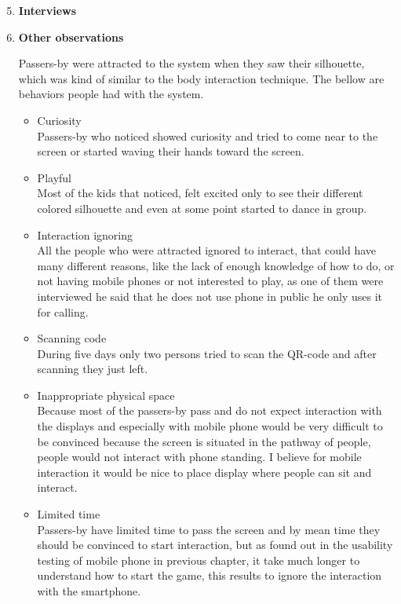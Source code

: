 \begin{enumerate}
\setcounter{enumi}{4}

\item \textbf{Interviews}



\newpage
\item \textbf{Other observations}

Passers-by were attracted to the system when they saw their silhouette, which was kind of similar to the body interaction technique. The bellow are behaviors people had with the system.

\begin{itemize}
\item Curiosity \\
Passers-by who noticed showed curiosity and tried to come near to the screen or started waving their hands toward the screen.
 

\item Playful   \\
Most of the kids that noticed, felt excited only to see their different colored silhouette and even at some point started to dance in group. 


\item Interaction ignoring \\
All the people who were attracted ignored to interact, that could have many different reasons, like the lack of enough knowledge of how to do, or not having mobile phones or not interested to play, as one of them were interviewed he said that he does not use phone in public he only uses it for calling. 

\item Scanning code \\ 
During five days only two persons tried to scan the QR-code and after scanning they just left.


\iffalse
\item Inappropriate physical space \\
Because most of the passers-by pass and do not expect interaction with the displays and especially with mobile phone would be very difficult to be convinced because the screen is situated in the pathway of people, people would not interact with phone standing. I believe for mobile interaction it would be nice to place display where people can sit and interact.

\item Limited time \\
Passers-by have limited time to pass the screen and by mean time they should be convinced to start interaction, but as found out in the usability testing of mobile phone in previous chapter, it take much longer to understand how to start the game, this results to ignore the interaction with the smartphone. 


\end{itemize}
\end{enumerate}
